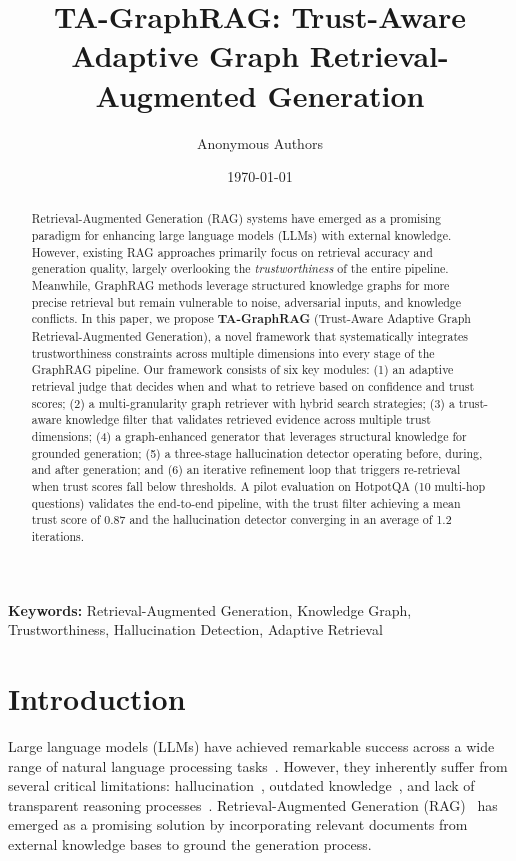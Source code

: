 \documentclass[11pt,a4paper]{article}
\title{\textbf{TA-GraphRAG: Trust-Aware Adaptive Graph Retrieval-Augmented Generation}}
\author{
  Anonymous Authors
}
\date{\today}
\begin{document}
\maketitle

\begin{abstract}
Retrieval-Augmented Generation (RAG) systems have emerged as a promising paradigm for enhancing large language models (LLMs) with external knowledge. However, existing RAG approaches primarily focus on retrieval accuracy and generation quality, largely overlooking the \textit{trustworthiness} of the entire pipeline. Meanwhile, GraphRAG methods leverage structured knowledge graphs for more precise retrieval but remain vulnerable to noise, adversarial inputs, and knowledge conflicts. In this paper, we propose \textbf{TA-GraphRAG} (Trust-Aware Adaptive Graph Retrieval-Augmented Generation), a novel framework that systematically integrates trustworthiness constraints across multiple dimensions into every stage of the GraphRAG pipeline. Our framework consists of six key modules: (1) an adaptive retrieval judge that decides when and what to retrieve based on confidence and trust scores; (2) a multi-granularity graph retriever with hybrid search strategies; (3) a trust-aware knowledge filter that validates retrieved evidence across multiple trust dimensions; (4) a graph-enhanced generator that leverages structural knowledge for grounded generation; (5) a three-stage hallucination detector operating before, during, and after generation; and (6) an iterative refinement loop that triggers re-retrieval when trust scores fall below thresholds. A pilot evaluation on HotpotQA (10 multi-hop questions) validates the end-to-end pipeline, with the trust filter achieving a mean trust score of 0.87 and the hallucination detector converging in an average of 1.2 iterations.
\end{abstract}

\textbf{Keywords:} Retrieval-Augmented Generation, Knowledge Graph, Trustworthiness, Hallucination Detection, Adaptive Retrieval

\section{Introduction}

Large language models (LLMs) have achieved remarkable success across a wide range of natural language processing tasks~\cite{brown2020language,touvron2023llama}. However, they inherently suffer from several critical limitations: hallucination~\cite{rawte2023troubling}, outdated knowledge~\cite{kasai2022realtime}, and lack of transparent reasoning processes~\cite{zhao2023survey}. Retrieval-Augmented Generation (RAG)~\cite{lewis2021retrievalaugmented} has emerged as a promising solution by incorporating relevant documents from external knowledge bases to ground the generation process.
\end{document}

